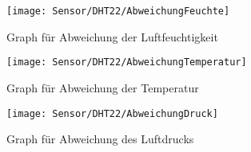 \begin{figure}[H]
    \centering
    \texttt{[image: Sensor/DHT22/AbweichungFeuchte]}
    \caption{Graph für Abweichung der Luftfeuchtigkeit}
    \label{fig:ABWH}
\end{figure}

\begin{figure}[H]
    \centering
    \texttt{[image: Sensor/DHT22/AbweichungTemperatur]}
    \caption{Graph für Abweichung der Temperatur}
    \label{fig:ABWT}
\end{figure}

\begin{figure}[H]
    \centering
    \texttt{[image: Sensor/DHT22/AbweichungDruck]}
    \caption{Graph für Abweichung des Luftdrucks}
    \label{fig:ABWP}
\end{figure}